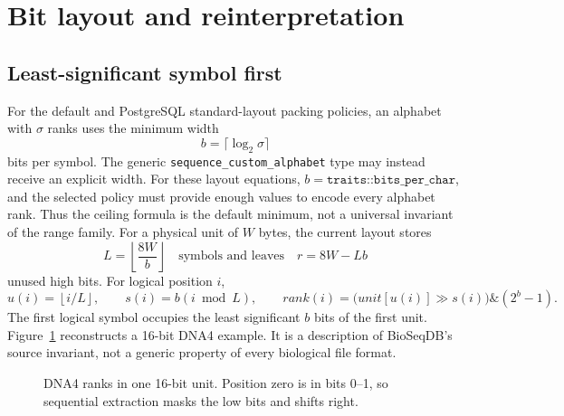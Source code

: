 \section{Bit layout and reinterpretation}
\label{sec:sequence-bit-layout}

\subsection{Least-significant symbol first}

For the default and PostgreSQL standard-layout packing policies, an alphabet
with \(\sigma\) ranks uses the minimum width
\[
 b=\lceil\log_2 \sigma\rceil
\]
bits per symbol.  The generic \texttt{sequence\_custom\_alphabet} type may
instead receive an explicit width.  For these layout equations,
\(b=\texttt{traits::bits\_per\_char}\), and the selected policy must provide
enough values to encode every alphabet rank.  Thus the ceiling formula is the
default minimum, not a universal invariant of the range family.  For a
physical unit of \(W\) bytes, the current layout stores
\[
 L=\left\lfloor\frac{8W}{b}\right\rfloor
 \quad\text{symbols and leaves}\quad
 r=8W-Lb
\]
unused high bits.  For logical position \(i\),
\[
  u(i)=\left\lfloor i/L\right\rfloor,\qquad
  s(i)=b(i\bmod L),\qquad
  rank(i)=\bigl(unit[u(i)]\gg s(i)\bigr)\mathbin{\&}(2^b-1).
\]
The first logical symbol occupies the least significant \(b\) bits of the
first unit.  Figure~\ref{fig:lsb-packed-layout} reconstructs a 16-bit DNA4
example.  It is a description of \mbox{BioSeqDB}'s source invariant, not a generic
property of every biological file format.

\begin{figure}[ht]
\centering
{}
\caption{DNA4 ranks in one 16-bit unit.  Position zero is in bits 0--1,
so sequential extraction masks the low bits and shifts right.}
\label{fig:lsb-packed-layout}
\end{figure}

